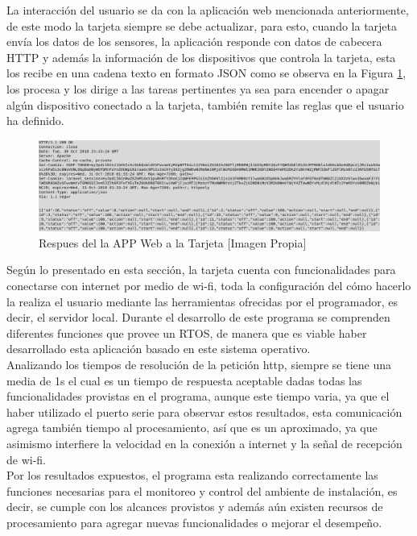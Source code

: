 La interacción del usuario se da con la aplicación web mencionada anteriormente, de este modo la tarjeta siempre se debe actualizar, para esto, cuando la tarjeta envía los datos de los sensores, la aplicación responde con datos de cabecera HTTP y además la información de los dispositivos que controla la tarjeta, esta los recibe en una cadena texto en formato JSON como se observa en la Figura \ref{fig:httprqstesp}, los procesa y los dirige a las tareas pertinentes ya sea para encender o apagar algún dispositivo conectado a la tarjeta, también remite las reglas que el usuario ha definido.\\

\begin{figure}[H]
	\centering
	\caption{Respues del la APP Web a la Tarjeta [Imagen Propia]}
	\label{fig:httprqstesp}
	\includegraphics[width=0.8\linewidth]{Imagenes/HTTPRqstesp}
\end{figure}

Según lo presentado en esta sección, la tarjeta cuenta con funcionalidades para conectarse con internet por medio de wi-fi, toda la configuración del cómo hacerlo la realiza el usuario mediante las herramientas ofrecidas por el programador, es decir, el servidor local. Durante el desarrollo de este programa se comprenden diferentes funciones que provee un RTOS, de manera que es viable haber desarrollado esta aplicación basado en este sistema operativo.\\

Analizando los tiempos de resolución de la petición http, siempre se tiene una media de 1s el cual es un tiempo de respuesta aceptable dadas todas las funcionalidades provistas en el programa, aunque este tiempo varia, ya que el haber utilizado el puerto serie para observar estos resultados, esta comunicación agrega también tiempo al procesamiento, así que es un aproximado, ya que asimismo interfiere la velocidad en la conexión a internet y la señal de recepción de wi-fi.\\

Por los resultados expuestos, el programa esta realizando correctamente las funciones necesarias para el monitoreo y control del ambiente de instalación, es decir, se cumple con los alcances provistos y además aún existen recursos de procesamiento para agregar nuevas funcionalidades o mejorar el desempeño.

